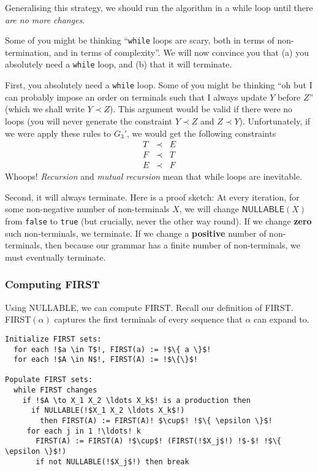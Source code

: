 Generalising this strategy, we should run the algorithm in a while loop until there \textit{are no more changes}.

Some of you might be thinking ``\texttt{while} loops are scary, both in terms of non-termination, and in terms of complexity''. We will now convince you that (a) you absolutely need a \texttt{while} loop, and (b) that it will terminate.

First, you absolutely need a \texttt{while} loop. Some of you might be thinking ``oh but I can probably impose an order on terminals such that I always update $Y$ before $Z$'' (which we shall write $Y \prec Z$). This argument would be valid if there were no loops (you will never generate the constraint $Y \prec Z$ and $Z \prec Y$). Unfortunately, if we were apply these rules to $G_3'$, we would get the following constraints
\[\begin{array}{rcl}
     T&\prec&E  \\
     F&\prec&T  \\
     E&\prec&F
\end{array}\]
Whoops! \textit{Recursion} and \textit{mutual recursion} mean that while loops are inevitable. 

Second, it will always terminate. Here is a proof sketch: At every iteration, for some non-negative number of non-terminals $X$, we will change $\textsf{NULLABLE}(X)$ from \texttt{false} to \texttt{true} (but crucially, never the other way round). If we change \textbf{zero} such non-terminals, we terminate. If we change a \textbf{positive} number of non-terminals, then because our grammar has a finite number of non-terminals, we must eventually terminate.

\subsubsection{Computing FIRST}
Using \textsf{NULLABLE}, we can compute \textsf{FIRST}. Recall our definition of \textsf{FIRST}. \textsf{FIRST}$(\alpha)$ captures the first terminals of every sequence that $\alpha$ can expand to.

\begin{lstlisting}[style=pseudocode]
Initialize FIRST sets:
  for each !$a \in T$!, FIRST(a) := !$\{ a \}$! 
  for each !$A \in N$!, FIRST(A) := !$\{\}$! 

Populate FIRST sets:
  while FIRST changes 
    if !$A \to X_1 X_2 \ldots X_k$! is a production then 
      if NULLABLE(!$X_1 X_2 \ldots X_k$!)
        then FIRST(A) := FIRST(A)! $\cup$! !$\{ \epsilon \}$!
     for each j in 1 !\ldots! k 
       FIRST(A) := FIRST(A) !$\cup$! (FIRST(!$X_j$!) !$-$! !$\{ \epsilon \}$!) 
       if not NULLABLE(!$X_j$!) then break 
\end{lstlisting}

